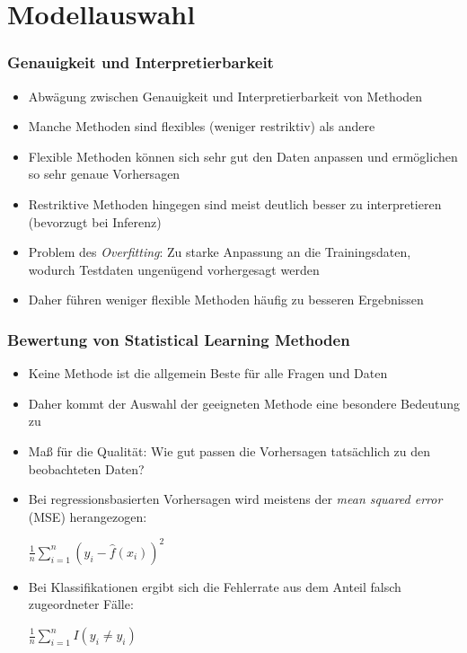 \documentclass{beamer}
\begin{document}
\section{Modellauswahl}

\begin{frame}
  \frametitle{Genauigkeit und Interpretierbarkeit}  
  \begin{itemize}
  \item Abwägung zwischen Genauigkeit und Interpretierbarkeit von Methoden
  \item Manche Methoden sind flexibles (weniger restriktiv) als andere
  \item Flexible Methoden können sich sehr gut den Daten anpassen und ermöglichen so sehr genaue Vorhersagen
  \item Restriktive Methoden hingegen sind meist deutlich besser zu interpretieren (bevorzugt bei Inferenz)
  \item Problem des \emph{Overfitting}: Zu starke Anpassung an die Trainingsdaten, wodurch Testdaten ungenügend vorhergesagt werden
  \item Daher führen weniger flexible Methoden häufig zu besseren Ergebnissen
  \end{itemize}  
\end{frame}

\begin{frame}
  \frametitle{Bewertung von Statistical Learning Methoden} 
  \begin{itemize}
  \item Keine Methode ist die allgemein Beste für alle Fragen und Daten
  \item Daher kommt der Auswahl der geeigneten Methode eine besondere Bedeutung zu
  \item Maß für die Qualität: Wie gut passen die Vorhersagen tatsächlich zu den beobachteten Daten?
  \item Bei regressionsbasierten Vorhersagen wird meistens der \emph{mean squared error} (MSE) herangezogen: \newline
\begin{center}
      $\frac{1}{n} \sum\limits_{i=1}^{n}(y_{i}-\hat{f}(x_{i}))^2$
  \end{center}  \item Bei Klassifikationen ergibt sich die Fehlerrate aus dem Anteil falsch zugeordneter Fälle:
  \newline
\begin{center}
      $\frac{1}{n} \sum\limits_{i=1}^{n}I(y_{i}\neq\hat{y_{i}})$
  \end{center}  
  \end{itemize}  
\end{frame}
\end{document}
